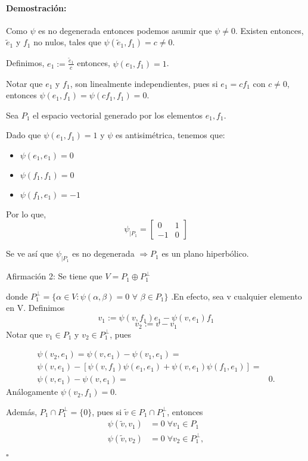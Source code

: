 \documentclass[12pt]{article}
\newenvironment{proof}{\paragraph{Demostración:}}{\hfill$\square$}
\begin{document}
\begin{proof}
Como $\psi$ es no degenerada entonces podemos asumir que $\psi \neq 0$.
Existen entonces, $\tilde{e}_1$ y $f_1$ no nulos, tales que $\psi(\tilde{e}_1,f_1)=c\neq0$.

Definimos, $e_1:=\frac{\tilde{e}_1}{c}$ entonces, $\psi(e_1,f_1)=1$.

Notar que $e_1$ y $f_1$, son linealmente independientes, pues si $e_1=c f_1$ con $c\neq 0$,
entonces $\psi(e_1,f_1)=\psi(c f_1,f_1)=0$.


Sea $P_1$ el espacio vectorial generado por los elementos $e_1,f_1$.
    
Dado que $\psi(e_1,f_1)=1$ y $\psi$ es antisimétrica, tenemos que:
\begin{itemize}
 \item $\psi(e_1,e_1)=0$
 \item $\psi(f_1,f_1)=0$
 \item $\psi(f_1,e_1)=-1$
\end{itemize}

Por lo que, 
$$\psi_{|P_1} = 
\begin{bmatrix}
 0 & 1\\ 
 -1& 0
\end{bmatrix}
$$

Se ve así que $\psi_{|P_1}$ es no degenerada $\Rightarrow P_1$ es un plano hiperbólico.
\newline

Afirmación 2: Se tiene que  $V = P_1 \oplus P_1^{\bot}$

 donde $P_1^{\bot}= \{ \alpha \in V: \psi(\alpha,\beta)=0$  $\forall$  $\beta \in P_1 \} $ .En efecto,  
 sea v cualquier elemento en V.
 Definimos 
 $$v_1:=\psi(v,f_1)e_1-\psi(v,e_1)f_1$$
 $$v_2:=v-v_1$$
 Notar que $v_1 \in P_1$ y $v_2 \in P_1^{\bot}$, pues 
 
 $$\begin{aligned}
 \psi(v_2,e_1)=\psi(v,e_1)-\psi(v_1,e_1)=&\\
 \psi (v,e_1)-[\psi(v,f_1) \psi(e_1,e_1) + \psi(v,e_1) \psi(f_1,e_1)]=&\\
 \psi(v,e_1)- \psi(v,e_1)=&0.
 \end{aligned}$$
 Análogamente $\psi(v_2,f_1)=0$.
 
 
 Además, $P_1  \cap P_1^{\bot} = \{0\}$, pues si  $\tilde{v} \in  P_1 \cap P_1^{\bot}$, entonces
 $$\begin{aligned}
 \psi(\tilde{v},v_1)&=0 \;\forall v_1 \in P_1\\ 
 \psi(\tilde{v},v_2)&=0 \;\forall v_2 \in P_1^{\bot},
 \end{aligned}$$
 

\end{proof}
\end{document}
